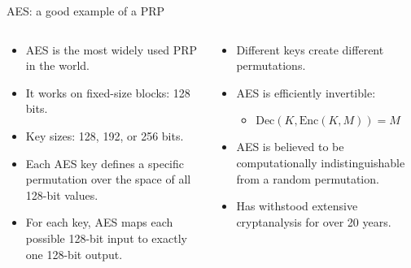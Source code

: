 \documentclass[aspectratio=169, lualatex, handout]{beamer}
\begin{document}
\begin{frame}{AES: a good example of a PRP}
	\begin{columns}[c]
		\begin{column}{0.5\textwidth}
			\begin{itemize}[<+->]
				\item AES is the most widely used PRP in the world.
				\item It works on fixed-size blocks: 128 bits.
				\item Key sizes: 128, 192, or 256 bits.
				\item Each AES key defines a specific permutation over the space of all 128-bit values.
				\item For each key, AES maps each possible 128-bit input to exactly one 128-bit output.
			\end{itemize}
		\end{column}
		\begin{column}{0.5\textwidth}
			\begin{itemize}[<+->]
				\item Different keys create different permutations.
				\item AES is efficiently invertible:
				      \begin{itemize}[<+->]
					      \item $\text{Dec}(K, \text{Enc}(K, M)) = M$
				      \end{itemize}
				\item AES is believed to be computationally indistinguishable from a random permutation.
				\item Has withstood extensive cryptanalysis for over 20 years.
			\end{itemize}
		\end{column}
	\end{columns}
\end{frame}
\end{document}

